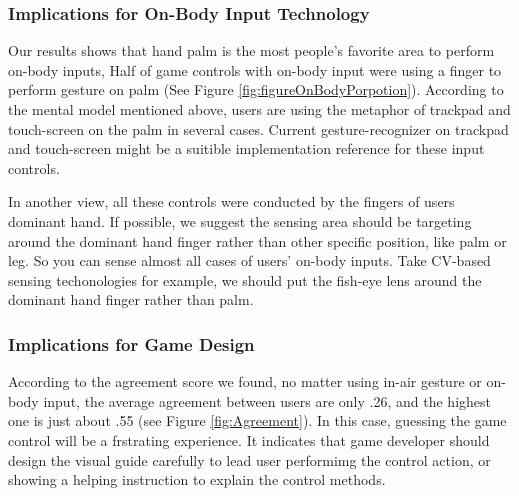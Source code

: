 \documentclass{sigchi}
\begin{document}
  \subsubsection{Implications for On-Body Input Technology}
    Our results shows that hand palm is the most people's favorite area to perform on-body inputs,
    Half of game controls with on-body input were using a finger to perform gesture on palm (See Figure \ref{fig:figureOnBodyPorpotion}). According to the mental model mentioned above, users are using the metaphor of trackpad and touch-screen on the palm in several cases. Current gesture-recognizer on trackpad and touch-screen might be a suitible implementation reference for these input controls.

    In another view, all these controls were conducted by the fingers of users dominant hand. If possible, we suggest the sensing area should be targeting around the dominant hand finger rather than other specific position, like palm or leg. So you can sense almost all cases of users' on-body inputs. Take CV-based sensing techonologies for example, we should put the fish-eye lens around the dominant hand finger rather than palm.



  \subsubsection{Implications for Game Design}
  According to the agreement score we found, no matter using in-air gesture or on-body input, the average agreement between users are only .26, and the highest one is just about .55 (see Figure \ref{fig:Agreement}). In this case, guessing the game control will be a frstrating experience. It indicates that game developer should design the visual guide carefully to lead user performimg the control action, or showing a helping instruction to explain the control methods.
\end{document}
